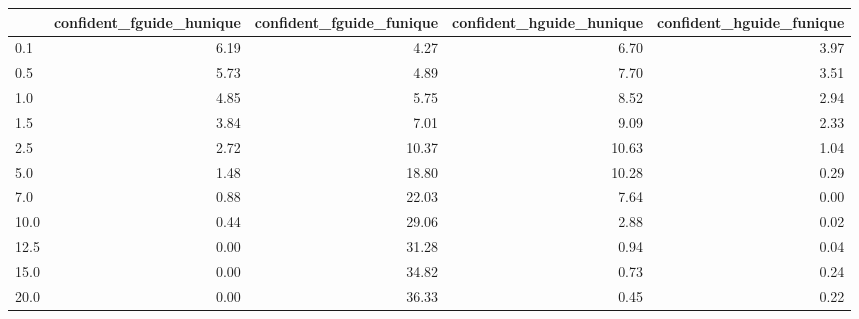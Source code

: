 \begin{tabular}{lrrrr}
\toprule
 & confident_fguide_hunique & confident_fguide_funique & confident_hguide_hunique & confident_hguide_funique \\
\midrule
0.1 & 6.19 & 4.27 & 6.70 & 3.97 \\
0.5 & 5.73 & 4.89 & 7.70 & 3.51 \\
1.0 & 4.85 & 5.75 & 8.52 & 2.94 \\
1.5 & 3.84 & 7.01 & 9.09 & 2.33 \\
2.5 & 2.72 & 10.37 & 10.63 & 1.04 \\
5.0 & 1.48 & 18.80 & 10.28 & 0.29 \\
7.0 & 0.88 & 22.03 & 7.64 & 0.00 \\
10.0 & 0.44 & 29.06 & 2.88 & 0.02 \\
12.5 & 0.00 & 31.28 & 0.94 & 0.04 \\
15.0 & 0.00 & 34.82 & 0.73 & 0.24 \\
20.0 & 0.00 & 36.33 & 0.45 & 0.22 \\
\bottomrule
\end{tabular}
